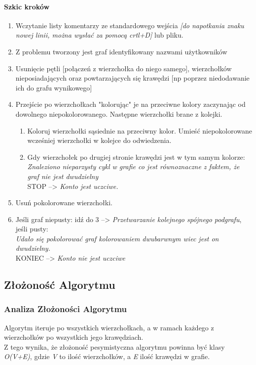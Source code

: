 \documentclass[11pt]{article}
\newcommand{\+}{\discretionary{\mbox{\scriptsize$\hookleftarrow$}}{}{}}
\begin{document}
\paragraph{Szkic kroków}
\renewcommand{\labelenumi}{\arabic{enumi}}
\begin{enumerate}
\item
Wczytanie listy komentarzy ze standardowego wejścia \textit{[do napotkania znaku nowej linii, można wysłać za pomocą crtl+D]} lub pliku.
\item
Z problemu tworzony jest graf identyfikowany nazwami użytkowników
\item
Usunięcie pętli [połączeń z wierzchołka do niego samego], wierzchołków nieposiadających oraz powtarzających się krawędzi [np poprzez niedodawanie ich do grafu wynikowego]
\item
Przejście po wierzchołkach "kolorując" je na przeciwne kolory zaczynając od dowolnego niepokolorowanego. Następne wierzchołki brane z kolejki.
\renewcommand{\labelenumii}{\Roman{enumii}}
\begin{enumerate}
\item
Koloruj wierzchołki sąsiednie na przeciwny kolor. Umieść niepokolorowane wcześniej wierzchołki w kolejce do odwiedzenia.
\item
Gdy wierzchołek po drugiej stronie krawędzi jest w tym samym kolorze: \\
\textit{Znaleziono nieparzysty cykl w grafie co jest równoznaczne z faktem, że graf nie jest dwudzielny}\\
STOP --> \textsl{Konto jest uczciwe.}
\end{enumerate}
\item
Usuń pokolorowane wierzchołki.
\item
Jeśli graf niepusty: idź do 3 --> \textsl{Przetwarzanie kolejnego spójnego podgrafu},\\ jeśli pusty: \\
\textit{Udało się pokolorować graf kolorowaniem dwubarwnym wiec jest on dwudzielny.}\\
KONIEC --> \textsl{Konto nie jest uczciwe}
\end{enumerate}
\subsection{Złożoność Algorytmu}
\subsubsection{Analiza Złożoności Algorytmu}
Algorytm iteruje po wszystkich wierzchołkach, a w ramach każdego z wierzchołków po wszystkich jego krawędziach.\\
Z tego wynika, że złożoność pesymistyczna algorytmu powinna być klasy \textit{O(V+E)}, gdzie \textit{V} to ilość wierzchołków, a \textit{E} ilość krawędzi w grafie.
\end{document}

